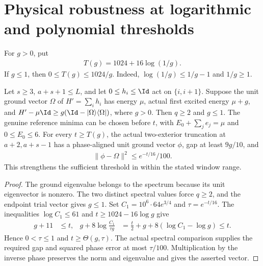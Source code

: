 \section{Physical robustness at logarithmic and polynomial thresholds}

\begin{definition}
    \label{def:aklv_logarithmic_threshold}
    \leanok
    For $g>0$, put
    \begin{align*}
        T(g)=1024+16\log(1/g).
    \end{align*}
    If $g\le1$, then $0\le T(g)\le1024/g$.
    Indeed, $\log(1/g)\le1/g-1$ and $1/g\ge1$.
\end{definition}

\begin{lemma}
    \label{thm:aklv_logarithmic_robustness}
    \leanok
    Let $s\ge3$, $a+s+1\le L$, and let $0\le h_i\le\Id$ act on
    $\{i,i+1\}$. Suppose the unit ground vector $\Omega$ of
    $H'=\sum_i h_i$ has energy $\mu$, actual first excited energy
    $\mu+g$, and
    $H'-\mu\Id\ge g(\Id-|\Omega\rangle\langle\Omega|)$, where $g>0$.
    Then $q\ge2$ and $g\le1$.
    The genuine reference minima can be chosen before $t$, with
    $E_0+\sum_j e_j=\mu$ and $0\le E_0\le6$.
    For every $t\ge T(g)$, the actual two-exterior truncation at
    $a+2,a+s-1$ has a phase-aligned unit ground vector $\phi$,
    gap at least $9g/10$, and
    \begin{align*}
        \|\phi-\Omega\|^2\le e^{-t/16}/100.
    \end{align*}
    This strengthens the sufficient threshold in
    \cite[Theorem~6.1]{Arad2013AreaLaw} within the stated window range.
\end{lemma}
\begin{proof}
    \leanok
    The ground eigenvalue belongs to the spectrum because its unit
    eigenvector is nonzero. The two distinct spectral values force $q\ge2$,
    and the endpoint trial vector gives $g\le1$.
    Set $C_1=10^6\cdot64e^{3/4}$ and $\tau=e^{-t/16}$.
    The inequalities $\log C_1\le61$ and $t\ge1024-16\log g$ give
    \begin{align*}
        g+11 & \le t,                               &
        g+8\log\frac{C_1}{\tau g}
             & =\frac t2+g+8(\log C_1-\log g)\le t.
    \end{align*}
    Hence $0<\tau\le1$ and $t\ge\Theta(g,\tau)$.
    The actual spectral comparison supplies the required gap and squared
    phase error at most $\tau/100$. Multiplication by the inverse phase
    preserves the norm and eigenvalue and gives the asserted vector.
\end{proof}

